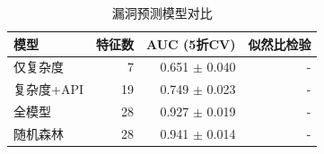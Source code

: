 \begin{table}[htbp]
\centering
\caption{漏洞预测模型对比}
\label{tab:model_comparison}
\begin{tabular}{lrrr}
\toprule
模型 & 特征数 & AUC (5折CV) & 似然比检验 \\
\midrule
仅复杂度 & 7 & 0.651 $\pm$ 0.040 & - \\
复杂度+API & 19 & 0.749 $\pm$ 0.023 & - \\
全模型 & 28 & 0.927 $\pm$ 0.019 & - \\
随机森林 & 28 & 0.941 $\pm$ 0.014 & - \\
\bottomrule
\end{tabular}
\end{table}